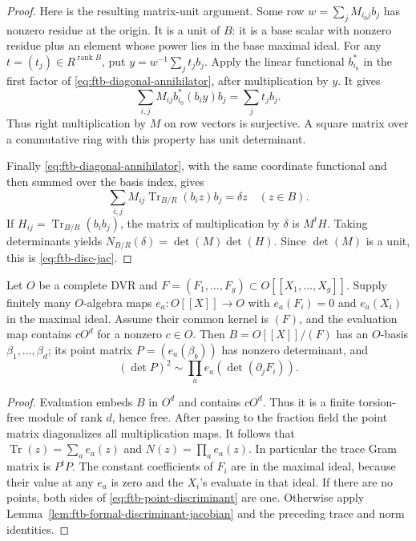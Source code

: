 \begin{proof}
Here is the resulting matrix-unit argument.  Some row
\(w=\sum_jM_{i_0j}b_j\) has nonzero residue at the origin.
It is a unit of \(B\): it is a base scalar with nonzero residue
plus an element whose power lies in the base maximal ideal.
For any \(t=(t_j)\in R^{\operatorname{rank} B}\), put
\(y=w^{-1}\sum_jt_jb_j\).
Apply the linear functional \(b_{i_0}^*\) in the first factor of
\eqref{eq:ftb-diagonal-annihilator}, after multiplication by \(y\).
It gives
\[
 \sum_{i,j}M_{ij}b_{i_0}^*(b_i y)b_j=\sum_jt_jb_j .
\]
Thus right multiplication by \(M\) on row vectors is surjective.
A square matrix over a commutative ring with this property has unit
determinant.

Finally \eqref{eq:ftb-diagonal-annihilator}, with the same coordinate
functional and then summed over the basis index, gives
\[
 \sum_{i,j}M_{ij}\operatorname{Tr}_{B/R}(b_i z)b_j
                           =\delta z\quad(z\in B).
\]
If \(H_{ij}=\operatorname{Tr}_{B/R}(b_ib_j)\), the matrix of
multiplication by \(\delta\) is \(M^tH\).
Taking determinants yields
\(N_{B/R}(\delta)=\det(M)\det(H)\).
Since \(\det(M)\) is a unit, this is
\eqref{eq:ftb-disc-jac}.
\end{proof}

\begin{srlemma}
\label{lem:ftb-formal-order-discriminant}
Let \(O\) be a complete DVR and
\(F=(F_1,\ldots,F_g)\subset O[[X_1,\ldots,X_g]]\).
Supply finitely many \(O\)-algebra maps \(e_a:O[[X]]\to O\)
with \(e_a(F_i)=0\) and \(e_a(X_i)\) in the maximal ideal.
Assume their common kernel is \((F)\), and the evaluation map
contains \(cO^d\) for a nonzero \(c\in O\).
Then \(B=O[[X]]/(F)\) has an \(O\)-basis \(\beta_1,\ldots,\beta_d\);
its point matrix \(P=(e_a(\beta_b))\) has nonzero determinant, and
\[
                 (\det P)^2\sim
                       \prod_a e_a(\det(\partial_jF_i)).
 \tag{K15}\label{eq:ftb-point-discriminant}
\]
\end{srlemma}
\begin{proof}
Evaluation embeds \(B\) in \(O^d\) and contains \(cO^d\).
Thus it is a finite torsion-free module of rank \(d\), hence free.
After passing to the fraction field the point matrix diagonalizes
all multiplication maps.
It follows that
\(\operatorname{Tr}(z)=\sum_ae_a(z)\) and
\(N(z)=\prod_ae_a(z)\).
In particular the trace Gram matrix is \(P^tP\).
The constant coefficients of \(F_i\) are in the maximal ideal,
because their value at any \(e_a\) is zero and the \(X_i\)'s
evaluate in that ideal.  If there are no points, both sides of
\eqref{eq:ftb-point-discriminant} are one.
Otherwise apply Lemma~\ref{lem:ftb-formal-discriminant-jacobian}
and the preceding trace and norm identities.
\end{proof}

